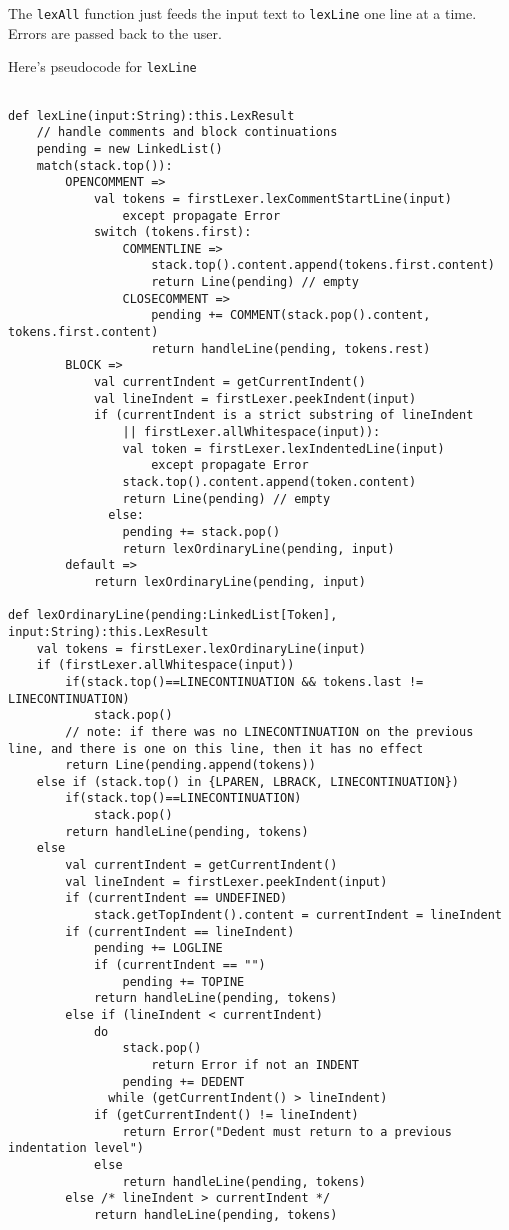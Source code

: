\documentclass[11pt]{article}
\begin{document}
\begin{sloppypar}
The \texttt{lexAll} function just feeds the input text to \texttt{lexLine} one line at a time.  Errors are passed back to the user.

Here's pseudocode for \texttt{lexLine}

\begin{lstlisting}

def lexLine(input:String):this.LexResult
    // handle comments and block continuations
    pending = new LinkedList()
    match(stack.top()):
        OPENCOMMENT => 
            val tokens = firstLexer.lexCommentStartLine(input)
                except propagate Error
            switch (tokens.first):
                COMMENTLINE =>
                    stack.top().content.append(tokens.first.content)
                    return Line(pending) // empty
                CLOSECOMMENT => 
                    pending += COMMENT(stack.pop().content, tokens.first.content)
                    return handleLine(pending, tokens.rest)
        BLOCK =>
            val currentIndent = getCurrentIndent()
            val lineIndent = firstLexer.peekIndent(input)
            if (currentIndent is a strict substring of lineIndent
                || firstLexer.allWhitespace(input)):
                val token = firstLexer.lexIndentedLine(input)
                    except propagate Error
                stack.top().content.append(token.content)
                return Line(pending) // empty
              else:
                pending += stack.pop()
                return lexOrdinaryLine(pending, input)
        default =>
            return lexOrdinaryLine(pending, input)
        
def lexOrdinaryLine(pending:LinkedList[Token], input:String):this.LexResult
    val tokens = firstLexer.lexOrdinaryLine(input)
    if (firstLexer.allWhitespace(input))
        if(stack.top()==LINECONTINUATION && tokens.last != LINECONTINUATION)
            stack.pop()
        // note: if there was no LINECONTINUATION on the previous line, and there is one on this line, then it has no effect
        return Line(pending.append(tokens))
    else if (stack.top() in {LPAREN, LBRACK, LINECONTINUATION})
        if(stack.top()==LINECONTINUATION)
            stack.pop()
        return handleLine(pending, tokens)
    else
        val currentIndent = getCurrentIndent()
        val lineIndent = firstLexer.peekIndent(input)
        if (currentIndent == UNDEFINED)
            stack.getTopIndent().content = currentIndent = lineIndent
        if (currentIndent == lineIndent)
            pending += LOGLINE
            if (currentIndent == "")
                pending += TOPINE
            return handleLine(pending, tokens)
        else if (lineIndent < currentIndent)
            do
                stack.pop()
                    return Error if not an INDENT
                pending += DEDENT
              while (getCurrentIndent() > lineIndent)
            if (getCurrentIndent() != lineIndent)
                return Error("Dedent must return to a previous indentation level")
            else
                return handleLine(pending, tokens)
        else /* lineIndent > currentIndent */
            return handleLine(pending, tokens)


\end{lstlisting}
\end{sloppypar}
\end{document}
